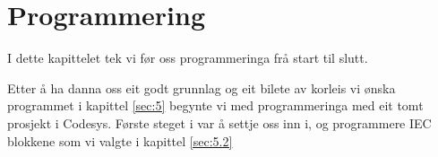 \chapter{Programmering}
\thispagestyle{fancy}
I dette kapittelet tek vi før oss programmeringa frå start til slutt.

Etter å ha danna oss eit godt grunnlag og eit bilete av korleis vi ønska programmet i kapittel \ref{sec:5} 
begynte vi med programmeringa med eit tomt prosjekt i \gls{Codesys}. Første steget i var å 
settje oss inn i, og programmere \gls{IEC} blokkene som vi valgte i kapittel \ref{sec:5.2}


